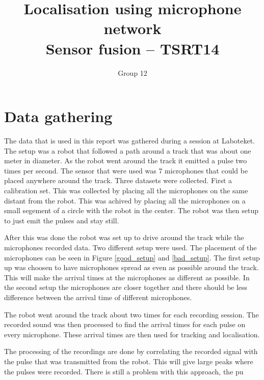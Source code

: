 \documentclass[10pt,a4paper]{report}
\begin{document}
\title{Localisation using microphone network\\Sensor fusion -- TSRT14}
\author{Group 12}
\maketitle


\tableofcontents

\newpage
\chapter{Data gathering}
\label{Data gathering}
The data that is used in this report was gathered during a session at Laboteket.
The setup was a robot that followed a path around a track that was about one meter in diameter.
As the robot went around the track it emitted a pulse two times per second.
The sensor that were used was 7 microphones that could be placed anywhere around the track.
Three datasets were collected.
First a calibration set. This was collected by placing all the microphones on the same distant from the robot.
This was achived by placing all the microphones on a small segement of a circle with the robot in the center.
The robot was then setup to just emit the pulses and stay still.

After this was done the robot was set up to drive around the track while the microphones recorded data.
Two different setup were used. The placement of the microphones can be seen in Figure \ref{good_setup} and \ref{bad_setup}.
The first setup up was choosen to have microphones spread as even as possible around the track.
This will make the arrival times at the microphones as different as possible.
In the second setup the microphones are closer together and there should be less difference between the arrival time of different microphones.

The robot went around the track about two times for each recording session.
The recorded sound was then processed to find the arrival times for each pulse on every microphone.
These arrival times are then used for tracking and localisation.

The processing of the recordings are done by correlating the recorded signal with the pulse that was transmitted from the robot.
This will give large peaks where the pulses were recorded.
There is still a problem with this approach, the pu
\end{document}
